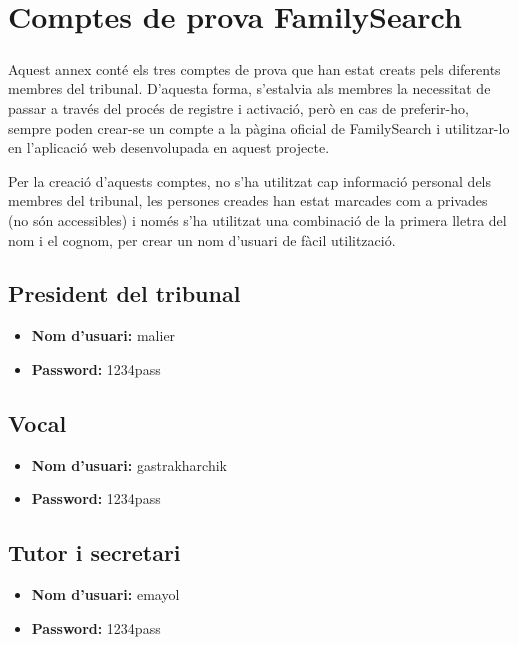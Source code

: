\chapter{Comptes de prova FamilySearch}

\paragraph{}
Aquest annex conté els tres comptes de prova que han estat creats pels diferents membres del tribunal. D’aquesta forma, s’estalvia als membres la necessitat de passar a través del procés de registre i activació, però en cas de preferir-ho, sempre poden crear-se un compte a la pàgina oficial de FamilySearch i utilitzar-lo en l’aplicació web desenvolupada en aquest projecte.

Per la creació d’aquests comptes, no s’ha utilitzat cap informació personal dels membres del tribunal, les persones creades han estat marcades com a privades (no són accessibles) i només s’ha utilitzat una combinació de la primera lletra del nom i el cognom, per crear un nom d’usuari de fàcil utilització.

\section{President del tribunal}
\begin{itemize}
    \item \textbf{Nom d'usuari: }malier
    \item \textbf{Password: }1234pass
\end{itemize}

\section{Vocal}
\begin{itemize}
    \item \textbf{Nom d'usuari: }gastrakharchik
    \item \textbf{Password: }1234pass
\end{itemize}

\section{Tutor i secretari}
\begin{itemize}
    \item \textbf{Nom d'usuari: }emayol
    \item \textbf{Password: }1234pass
\end{itemize}
